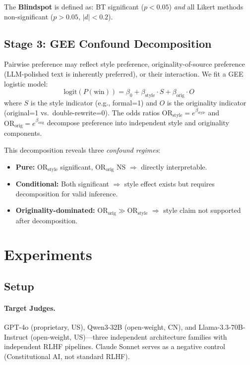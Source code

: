 \documentclass[11pt,twocolumn]{article}
\begin{document}
The \textbf{Blindspot} is defined as: BT significant ($p < 0.05$) \emph{and} all Likert methods non-significant ($p > 0.05$, $|d| < 0.2$).

\subsection{Stage 3: GEE Confound Decomposition}
\label{sec:gee}

Pairwise preference may reflect style preference, originality-of-source preference (LLM-polished text is inherently preferred), or their interaction. We fit a GEE logistic model:
\begin{equation}
\text{logit}(P(\text{win})) = \beta_0 + \beta_{\text{style}} \cdot S + \beta_{\text{orig}} \cdot O
\label{eq:gee}
\end{equation}
where $S$ is the style indicator (e.g., formal=1) and $O$ is the originality indicator (original=1 vs.\ double-rewrite=0). The odds ratios $\text{OR}_{\text{style}} = e^{\beta_{\text{style}}}$ and $\text{OR}_{\text{orig}} = e^{\beta_{\text{orig}}}$ decompose preference into independent style and originality components.

This decomposition reveals three \emph{confound regimes}:
\begin{itemize}
\item \textbf{Pure:} $\text{OR}_{\text{style}}$ significant, $\text{OR}_{\text{orig}}$ NS $\Rightarrow$ directly interpretable.
\item \textbf{Conditional:} Both significant $\Rightarrow$ style effect exists but requires decomposition for valid inference.
\item \textbf{Originality-dominated:} $\text{OR}_{\text{orig}} \gg \text{OR}_{\text{style}}$ $\Rightarrow$ style claim not supported after decomposition.
\end{itemize}

\section{Experiments}
\label{sec:experiments}

\subsection{Setup}
\label{sec:setup}

\paragraph{Target Judges.} GPT-4o (proprietary, US), Qwen3-32B (open-weight, CN), and Llama-3.3-70B-Instruct (open-weight, US)---three independent architecture families with independent RLHF pipelines. Claude Sonnet serves as a negative control (Constitutional AI, not standard RLHF).
\end{document}
